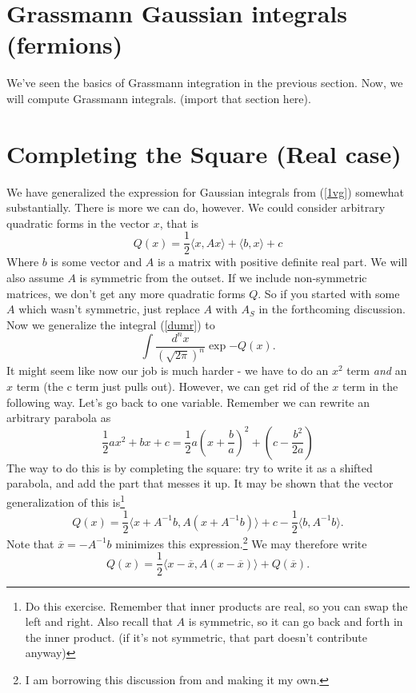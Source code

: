 \documentclass{book}
\begin{document}
\section{Grassmann Gaussian integrals (fermions)}
We've seen the basics of Grassmann integration in the previous section. Now, we will compute Grassmann integrals. (import that section here).

\newpage
\section{Completing the Square (Real case)}
We have generalized the expression for Gaussian integrals from (\ref{1vg}) somewhat substantially. There is more we can do, however. We could consider arbitrary quadratic forms in the vector $x$, that is
\begin{equation} \label{qform}
Q(x) = \frac{1}{2} \langle x, A x \rangle + \langle b, x \rangle + c
\end{equation}
Where $b$ is some vector and $A$ is a matrix with positive definite real part. We will also assume $A$ is symmetric from the outset. If we include non-symmetric matrices, we don't get any more quadratic forms $Q$. So if you started with some $A$ which wasn't symmetric, just replace $A$ with $A_S$ in the forthcoming discussion. Now we generalize the integral (\ref{dumr}) to
\begin{equation} \label{quadint}
\int \frac{d^n x}{(\sqrt{2\pi})^n} \exp{-Q(x)}.
\end{equation}
It might seem like now our job is much harder - we have to do an $x^2$ term \textit{and} an $x$ term (the c term just pulls out). However, we can get rid of the $x$ term in the following way. Let's go back to one variable. Remember we can rewrite an arbitrary parabola as
\begin{equation} \label{grade8}
\frac{1}{2} a x^2 + bx + c = \frac{1}{2} a\left( x + \frac{b}{a} \right)^2 + \left( c - \frac{b^2}{2a} \right)
\end{equation}
The way to do this is by completing the square: try to write it as a shifted parabola, and add the part that messes it up. It may be shown that the vector generalization of this is\footnote{Do this exercise. Remember that inner products are real, so you can swap the left and right. Also recall that $A$ is symmetric, so it can go back and forth in the inner product. (if it's not symmetric, that part doesn't contribute anyway)}
\[
Q(x) = \frac{1}{2} \langle x + A^{-1}b, A \left( x + A^{-1}b\right) \rangle + c - \frac{1}{2}\langle b, A^{-1} b \rangle.
\]
Note that $\overline{x} = -A^{-1} b$ minimizes this expression.\footnote{I am borrowing this discussion from \cite{Co1} and making it my own.} We may therefore write
\[
Q(x) = \frac{1}{2} \langle x - \overline{x}, A(x - \overline{x}) \rangle + Q(\overline{x}).
\]
\end{document}
